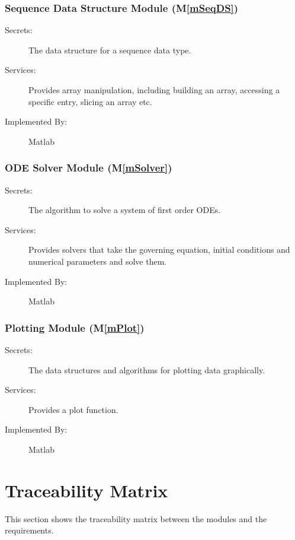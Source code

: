 \documentclass[12pt]{article}
\newcommand{\mref}[1]{M\ref{#1}}
\begin{document}
\subsubsection{Sequence Data Structure Module (\mref{mSeqDS})}

\begin{description}
\item[Secrets:] The data structure for a sequence data type.
\item[Services:] Provides array manipulation, including building an array,
  accessing a specific entry, slicing an array etc.
\item[Implemented By:] Matlab
\end{description}

\subsubsection{ODE Solver Module (\mref{mSolver})}

\begin{description}
\item[Secrets:] The algorithm to solve a system of first order ODEs.
\item[Services:] Provides solvers that take the governing equation, initial
  conditions and numerical parameters and solve them.
\item[Implemented By:] Matlab
\end{description}

\subsubsection{Plotting Module (\mref{mPlot})}

\begin{description}
\item[Secrets:] The data structures and algorithms for plotting data graphically.
\item[Services:] Provides a plot function.
\item[Implemented By:] Matlab
\end{description}

\section{Traceability Matrix} \label{SecTM}

This section shows the traceability matrix between the modules and the
requirements.
\end{document}
